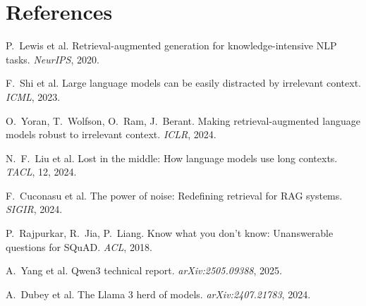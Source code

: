 \documentclass[11pt]{article}
\begin{document}
\clearpage
\section*{References}
\begingroup\small
\begin{enumerate}[label={[\arabic*]}, leftmargin=2em, itemsep=0.1em, topsep=0.2em]
\item P.~Lewis et al. Retrieval-augmented generation for knowledge-intensive NLP tasks. \emph{NeurIPS}, 2020.
\item F.~Shi et al. Large language models can be easily distracted by irrelevant context. \emph{ICML}, 2023.
\item O.~Yoran, T.~Wolfson, O.~Ram, J.~Berant. Making retrieval-augmented language models robust to irrelevant context. \emph{ICLR}, 2024.
\item N.~F.~Liu et al. Lost in the middle: How language models use long contexts. \emph{TACL}, 12, 2024.
\item F.~Cuconasu et al. The power of noise: Redefining retrieval for RAG systems. \emph{SIGIR}, 2024.
\item P.~Rajpurkar, R.~Jia, P.~Liang. Know what you don't know: Unanswerable questions for SQuAD. \emph{ACL}, 2018.
\item A.~Yang et al. Qwen3 technical report. \emph{arXiv:2505.09388}, 2025.
\item A.~Dubey et al. The Llama 3 herd of models. \emph{arXiv:2407.21783}, 2024.
\end{enumerate}
\endgroup
\end{document}
